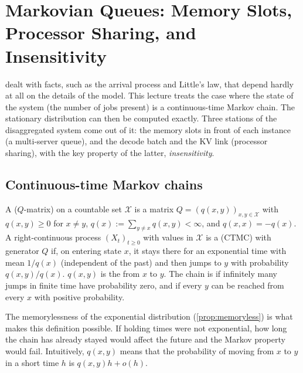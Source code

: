 \chapter{Markovian Queues: Memory Slots, Processor Sharing, and Insensitivity}\label{sec:L2}

 dealt with facts, such as the arrival process and Little's law, that
depend hardly at all on the details of the model. This lecture treats the case where
the state of the system (the number of jobs present) is a continuous-time Markov
chain. The stationary distribution can then be computed exactly. Three stations of the
disaggregated system come out of it: the memory slots in front of each instance
(a multi-server queue), and the decode batch and the KV link (processor sharing), with
the key property of the latter, \emph{insensitivity}.

\section{Continuous-time Markov chains}

\begin{definition}\label{def:ctmc}
A  ($Q$-matrix) on a countable set $\mathcal{X}$ is a matrix
$Q=(q(x,y))_{x,y\in\mathcal{X}}$ with $q(x,y)\ge 0$ for $x\ne y$,
$q(x):=\sum_{y\ne x}q(x,y)<\infty$, and $q(x,x)=-q(x)$.
A right-continuous process $(X_t)_{t\ge0}$ with values in $\mathcal{X}$ is a
 (CTMC) with generator $Q$ if, on entering state
$x$, it stays there for an exponential time with mean $1/q(x)$ (independent of the
past) and then jumps to $y$ with probability $q(x,y)/q(x)$. $q(x,y)$ is the
 from $x$ to $y$.
The chain is  if infinitely many jumps in finite time have
probability zero, and  if every $y$ can be reached from every $x$
with positive probability.
\end{definition}

The memorylessness of the exponential distribution (\cref{prop:memoryless}) is what
makes this definition possible. If holding times were not exponential, how long the
chain has already stayed would affect the future and the Markov property would fail.
Intuitively, $q(x,y)$ means that the probability of moving from $x$ to $y$ in a short
time $h$ is $q(x,y)h+o(h)$.

